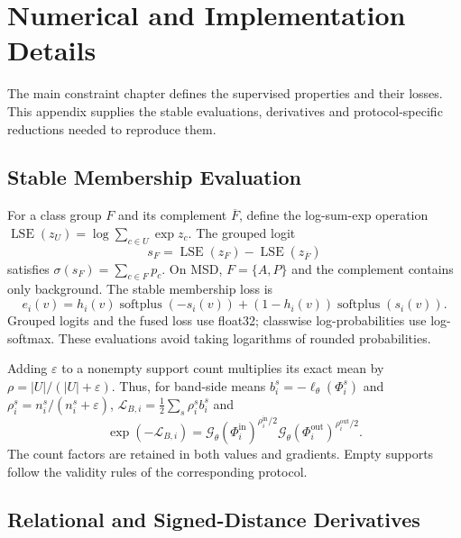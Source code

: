 \documentclass[12pt,a4paper]{article}
\begin{document}
\section{Numerical and Implementation Details}
\label{sec:technical-details}

The main constraint chapter defines the supervised properties and their
losses. This appendix supplies the stable evaluations, derivatives and
protocol-specific reductions needed to reproduce them.

\subsection{Stable Membership Evaluation}

For a class group $F$ and its complement $\overline F$, define the
log-sum-exp operation $\operatorname{LSE}(z_U)=\log\sum_{c\in U}\exp z_c$. The grouped logit
\begin{equation}
s_F=\operatorname{LSE}(z_F)-\operatorname{LSE}(z_{\overline F})
\label{eq:grouped-predicate-logit}
\end{equation}
satisfies $\sigma(s_F)=\sum_{c\in F}p_c$. On MSD, $F=\{A,P\}$
and the complement contains only background. The stable membership loss is
\begin{equation}
e_i(v)=h_i(v)\operatorname{softplus}(-s_i(v))
       +(1-h_i(v))\operatorname{softplus}(s_i(v)).
\label{eq:band-stable-bce}
\end{equation}
Grouped logits and the fused loss use float32; classwise log-probabilities
use log-softmax. These evaluations avoid taking logarithms of rounded
probabilities.

Adding $\varepsilon$ to a nonempty support count multiplies its exact
mean by $\rho=|U|/(|U|+\varepsilon)$. Thus, for band-side means
$b_i^s=-\ell_\theta(\Phi_i^s)$ and
$\rho_i^s=n_i^s/(n_i^s+\varepsilon)$,
$\mathcal L_{B,i}=\tfrac12\sum_s\rho_i^s b_i^s$ and
\begin{equation}
\exp(-\mathcal{L}_{B,i})
=\mathcal{G}_\theta(\Phi_i^{\mathrm{in}})^{\rho_i^{\mathrm{in}}/2}
 \mathcal{G}_\theta(\Phi_i^{\mathrm{out}})^{\rho_i^{\mathrm{out}}/2}.
\label{eq:balanced-band-satisfaction}
\end{equation}
The count factors are retained in both values and gradients. Empty
supports follow the validity rules of the corresponding protocol.

\subsection{Relational and Signed-Distance Derivatives}
\end{document}
